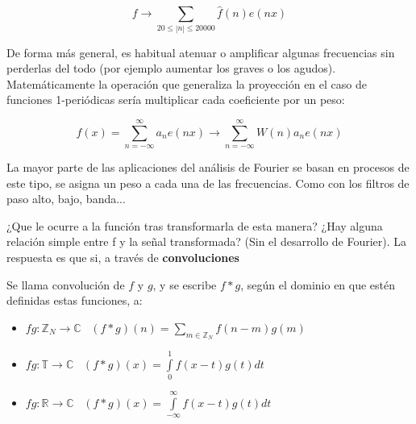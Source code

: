 \[f \to \sum_{20\leq |n|\leq 20000}\hat{f}(n)e(nx)\]


De forma más general, es habitual atenuar o amplificar algunas frecuencias sin perderlas del todo (por ejemplo aumentar los graves o los agudos). Matemáticamente la operación que generaliza la proyección en el caso de funciones 1-periódicas sería multiplicar cada coeficiente por un peso:

\[f(x) = \sum\limits^{\infty}_{n = -\infty} a_n e(nx) \rightarrow \sum\limits^{\infty}_{n = - \infty} W(n) a_n e(nx)\]

La mayor parte de las aplicaciones del análisis de Fourier se basan en procesos de este tipo, se asigna un peso a cada una de las frecuencias. Como con los filtros de paso alto, bajo, banda...

¿Que le ocurre a la función tras transformarla de esta manera? ¿Hay alguna relación simple entre f y la señal transformada? (Sin el desarrollo de Fourier). La respuesta es que si, a través de \textbf{convoluciones}

\begin{defn}[Convolución]
	Se llama convolución de $f$ y $g$, y se escribe $f*g$, según el dominio en que estén definidas estas funciones, a:
	\begin{itemize}
		\item $fg :\mathbb{Z}_{N} \rightarrow \mathbb{C} \;\;\; (f * g)(n) = \sum\limits_{m \in \mathbb{Z}_{N}} f(n-m)g(m)$
		\item $fg :\mathbb{T} \rightarrow \mathbb{C} \;\;\; (f * g)(x) = \int\limits^{1}_{0} f(x-t)g(t)dt$
		\item $fg :\mathbb{R} \rightarrow \mathbb{C} \;\;\; (f * g)(x) = \int\limits^{\infty}_{-\infty} f(x-t)g(t)dt$
	\end{itemize}

\end{defn}

%
%
%
%
%
%
%
%
%
%
%


